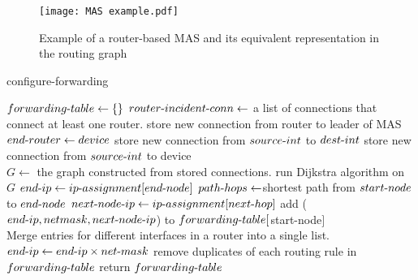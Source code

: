 \documentclass{uiucthesis2021}
\begin{document}
\label{f34}
\begin{figure}[H]
\texttt{[image: MAS example.pdf]}
\centering
\caption{Example of a router-based MAS and its equivalent representation in the routing graph}
\centering
\end{figure}

\begin{algorithm}[H]
\caption{configure-forwarding}\label{alg:cap}
\begin{algorithmic}
    \State $forwarding{\text -}table \gets \{\}$
    \State $router{\text -}incident{\text -}conn \gets $ a list of connections that connect at least one router. 
            \State store new connection from router to leader of MAS
        \Else
                    $end{\text -}router \gets device$
                        \State store new connection from $source{\text -}int$ to $dest{\text -}int$
                    \EndFor
                \Else
                    \State store new connection from $source{\text -}int$ to device
                \EndIf
            \EndFor
        \EndIf
    \EndFor
    \\
    \State $G \gets$ the graph constructed from stored connections.
    \State run Dijkstra algorithm on $G$
                    \State $end{\text- }ip \gets ip{\text- }assignment[end{\text- }node]$
                    \State $path{\text -}hops \gets $shortest path from $start{\text-}node$ to $end{\text -}node$
                            \State $next{\text-}node{\text-}ip \gets ip{\text-}assignment[next{\text-}hop]$
                            \State add ($end{\text-}ip, netmask, next{\text-}node{\text-}ip$) to $forwarding{\text-}table[$start{\text-}node$]$
                        \EndIf
                    \EndFor
                \EndIf
            \EndFor
        \EndIf
    \EndFor
   \\
   \State Merge entries for different interfaces in a router 
   into a single list.
        \State $end{\text-}ip \gets end{\text-}ip \times net{\text-}mask$
   \EndFor
   \State remove duplicates of each routing rule in $forwarding{\text-}table$
   \State return $forwarding{\text-}table$
\end{algorithmic}
\end{algorithm} 
\end{document}
